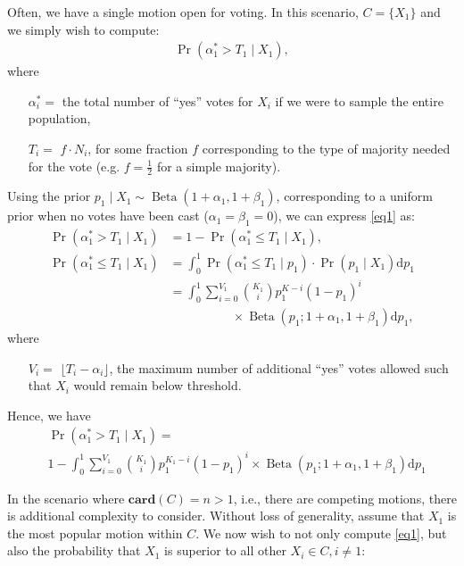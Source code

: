 \documentclass{sigchi}
\begin{document}
Often, we have a single motion open for voting.  In this scenario, $C=\{X_1\}$ and we simply wish to compute:
\begin{align}\label{eq1}
\Pr(\alpha^*_1 > T_1 \mid X_1),
\end{align}
where
\begin{description}
\begin{itemize}
\item[$\alpha^*_i = $] the total number of ``yes'' votes for $X_i$ if we were to sample the entire population,
\item[$T_i = $] $f \cdot N_i$, for some fraction $f$ corresponding to the type of majority needed for the vote
(e.g. $f=\frac{1}{2}$ for a simple majority).
\end{itemize}
\end{description}
Using the prior $p_1 \mid X_1 \sim \operatorname{Beta}(1+\alpha_1,1+\beta_1)$, corresponding to a uniform prior when
no votes have been cast ($\alpha_1 = \beta_1 = 0$), we can express \eqref{eq1} as:
\begin{align*}
\Pr(\alpha^*_1 > T_1 \mid X_1) &= 1 - \Pr(\alpha^*_1 \leq T_1 \mid X_1),\\
\Pr(\alpha^*_1 \leq T_1 \mid X_1) &= \int_0^1 \Pr(\alpha^*_1 \leq T_1 \mid p_1)\cdot \Pr(p_1 \mid X_1) \mathrm{d}p_1\\
&= \int_0^1 \sum\limits_{i=0}^{V_1} {K_1 \choose i} p_1^{K-i} {(1-p_1)}^{i} \\
& \qquad\qquad\quad \times \operatorname{Beta}(p_1; 1+\alpha_1,1+\beta_1) \mathrm{d}p_1,
\end{align*}
where
\begin{description}
\begin{itemize}
\item[$V_i = $] $\lfloor{T_i - \alpha_i}\rfloor$, the maximum number of additional ``yes'' votes allowed such that
$X_i$ would remain below threshold.
\end{itemize}
\end{description}

Hence, we have
\begin{align}\label{eq2}
& \Pr(\alpha^*_1 > T_1 \mid X_1) = \nonumber\\
& 1 - \int_0^1 \sum\limits_{i=0}^{V_1} {K_1 \choose i} p_1^{K_1-i} {(1-p_1)}^{i} \times \operatorname{Beta}(p_1; 1+\alpha_1,1+\beta_1) \mathrm{d}p_1
\end{align}

In the scenario where $\mathbf{card}(C) = n > 1$, i.e., there are competing motions, there is additional complexity to
consider.
Without loss of generality, assume that $X_1$ is the most popular motion within $C$.
We now wish to not only compute \eqref{eq1}, but also the probability that $X_1$ is superior to all other
$X_i  \in C, i \neq 1$:
\end{document}
